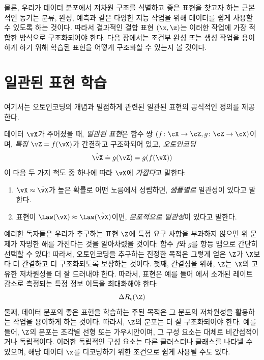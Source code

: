\documentclass[../../book-main_ko.tex]{subfiles}
\begin{document}
물론, 우리가 데이터 분포에서 저차원 구조를 식별하고 좋은 표현을 찾고자 하는 근본적인 동기는 분류, 완성, 예측과 같은 다양한 지능 작업을 위해 데이터를 쉽게 사용할 수 있도록 하는 것이다.
따라서 결과적인 결합 표현 $(\x, \z)$는 이러한 작업에 가장 적합한 방식으로 구조화되어야 한다. 다음 장에서는 조건부 완성 또는 생성 작업을 용이하게 하기 위해 학습된 표현을 어떻게 구조화할 수 있는지 볼 것이다.

\section{일관된 표현 학습}\label{sec:consistent-representation}

여기서는 오토인코딩의 개념과 밀접하게 관련된 일관된 표현의 공식적인 정의를 제공한다. %
\begin{definition}[일관된 표현]\label{def:bidirectional_rep}
  데이터 $\vX$가 주어졌을 때, \textit{일관된 표현}은 함수 쌍 $(f \colon \cX \to \cZ, g \colon \cZ \to \cX)$이며, \textit{특징} $\vZ = f(\vX)$가 간결하고 구조화되어 있고, \textit{오토인코딩}
  \begin{equation}
    \hat{\vX} \doteq g(\vZ) = g(f(\vX))
  \end{equation}
  이 다음 두 가지 척도 중 하나에 따라 $\vX$에 \textit{가깝다}고 말한다:
  \begin{enumerate}
    	\item $\vX \approx \hat{\vX}$가 높은 확률로 어떤 노름에서 성립하면, \textit{샘플별로} 일관성이 있다고 말한다.
    	\item 표현이 $\Law(\vX) \approx \Law(\hat{\vX})$이면, \textit{분포적으로 일관성}이 있다고 말한다.
  \end{enumerate}
\end{definition}

예리한 독자들은 우리가 추구하는 표현 $\Z$에 특정 요구 사항을 부과하지 않으면 위 문제가 자명한 해를 가진다는 것을 알아차렸을 것이다: 함수 $f$와 $g$를 항등 맵으로 간단히 선택할 수 있다! 따라서, 오토인코딩을 추구하는 진정한 목적은 그렇게 얻은 $\Z$가 $\X$보다 더 간결하고 더 구조화되도록 보장하는 것이다. 첫째, 간결성을 위해, $\Z$는 $\X$의 고유한 저차원성을 더 잘 드러내야 한다.
따라서, 표현은 예를 들어 에서 소개된 레이트 감소로 측정되는 특정 정보 이득을 최대화해야 한다:
\begin{equation}
  \Delta R_{\epsilon}(\Z)
\end{equation}
둘째, 데이터 분포의 좋은 표현을 학습하는 주된 목적은 그 분포의 저차원성을 활용하는 작업을 용이하게 하는 것이다. 따라서, $\Z$의 분포는 더 잘 구조화되어야 한다. 예를 들어, $\Z$의 분포는 조각별 선형 또는 가우시안이며, 그 구성 요소는 대체로 비간섭적이거나 독립적이다. 이러한 독립적인 구성 요소는 다른 클러스터나 클래스를 나타낼 수 있으며, 해당 데이터 $\x$를 디코딩하기 위한 조건으로 쉽게 사용될 수도 있다.
\end{document}
